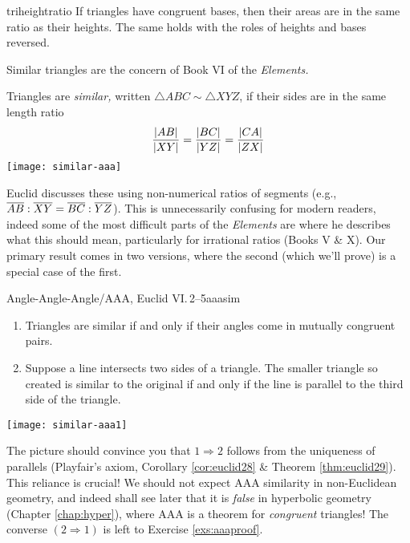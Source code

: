 \begin{lemm}{}{triheightratio}
	If triangles have congruent bases, then their areas are in the same ratio as their heights. The same holds with the roles of heights and bases reversed.
\end{lemm} 



Similar triangles are the concern of Book VI of the \emph{Elements.}

\begin{defn}[lower separated=false, sidebyside, sidebyside align=top seam, sidebyside gap=0pt, righthand width=0.32\linewidth]{}{}
	Triangles are \emph{similar,} written $\triangle ABC\sim\triangle XYZ$, if their sides are in the same length ratio
	\[
		\frac{\left| AB\right|}{\left| XY\right|}=\frac{\left| BC\right|}{\left| YZ\right|}=\frac{\left| CA\right|}{\left| ZX\right|}
	\]
	\tcblower
	\flushright\texttt{[image: similar-aaa]}
\end{defn}

Euclid discusses these using non-numerical ratios of segments (e.g., $\overline{AB}:\overline{XY}=\overline{BC}:\overline{YZ}$). This is unnecessarily confusing for modern readers, indeed some of the most difficult parts of the \emph{Elements} are where he describes what this should mean, particularly for irrational ratios (Books V \& X).\medbreak
Our primary result comes in two versions, where the second (which we'll prove) is a special case of the first.

\begin{thm}[lower separated=false, sidebyside, sidebyside align=top seam, sidebyside gap=0pt, righthand width=0.25\linewidth]{Angle-Angle-Angle/AAA, Euclid VI.\,2--5}{aaasim}
	\begin{enumerate}\itemsep0pt
	  \item Triangles are similar if and only if their angles come in mutually congruent pairs.
	  \item Suppose a line intersects two sides of a triangle. The smaller triangle so created is similar to the original if and only if the line is parallel to the third side of the triangle.
	\end{enumerate}
	\tcblower
	\flushright
	\texttt{[image: similar-aaa1]}
\end{thm}

The picture should convince you that $1\Rightarrow 2$ follows from the uniqueness of parallels (Playfair's axiom, Corollary \ref{cor:euclid28} \& Theorem \ref{thm:euclid29}). This reliance is crucial! We should not expect AAA similarity in non-Euclidean geometry, and indeed shall see later that it is \emph{false} in hyperbolic geometry (Chapter \ref{chap:hyper}), where AAA is a theorem for \emph{congruent} triangles! The converse $(2\Rightarrow 1)$ is left to Exercise \ref{exs:aaaproof}. %

